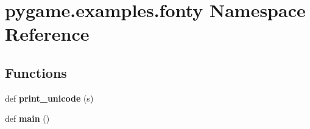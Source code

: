 \hypertarget{namespacepygame_1_1examples_1_1fonty}{}\section{pygame.\+examples.\+fonty Namespace Reference}
\label{namespacepygame_1_1examples_1_1fonty}
\subsection*{Functions}
\begin{DoxyCompactItemize}
\item 
\mbox{\label{namespacepygame_1_1examples_1_1fonty_aae19a43d265a3f820bd60f2bea57c37d}} 
def {\bfseries print\+\_\+unicode} (s)
\item 
\mbox{\label{namespacepygame_1_1examples_1_1fonty_a8e86292efd47d1bc96db0fe6007825c5}} 
def {\bfseries main} ()
\end{DoxyCompactItemize}
